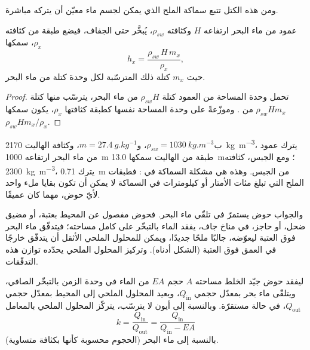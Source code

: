 ومن هذه الكتل تتبع سماكة الملح الذي يمكن لجسم ماء معيّن أن يتركه مباشرة.

\begin{proposition}\label{prop:b1:chemical-biogenic-sediments:column}
عمود من ماء البحر ارتفاعه $H$ وكثافته $\rho_{sw}$، يُبخَّر حتى الجفاف، فيضع طبقة من  كثافته $\rho_x$، سمكها
\[
h_x = \frac{\rho_{sw}\,H\,m_x}{\rho_x},
\]
حيث $m_x$ كتلة ذلك  المترسّبة لكل وحدة كتلة من ماء البحر.
\end{proposition}

\begin{proof}
تحمل وحدة المساحة من العمود كتلة $\rho_{sw}H$ من ماء البحر، يترسّب منها كتلة $\rho_{sw}Hm_x$ من . وموزّعةً على وحدة المساحة نفسها كطبقة كثافتها $\rho_x$، يكون سمكها $\rho_{sw}Hm_x/\rho_x$.
\end{proof}

ب$\rho_{sw} = \qty{1030}{kg.m^{-3}}$، و$m = \qty{27.4}{g.kg^{-1}}$، وكثافة الهاليت \qty{2170}{kg.m^{-3}}، يترك عمود من ماء البحر ارتفاعه \qty{1000}{m} طبقة من الهاليت سمكها \qty{13.0}{m}؛ ومع الجبس، كثافته \qty{2300}{kg.m^{-3}}، يترك \qty{0.71}{m} من الجبس. وهذه هي مشكلة السماكة في : فطبقات الملح التي تبلغ مئات الأمتار أو كيلومترات في السماكة لا يمكن أن تكون بقايا ملء واحد لأيّ حوض، مهما كان عميقًا.

والجواب حوض يستمرّ في تلقّي ماء البحر. فحوض مفصول عن المحيط بعتبة، أو مضيق ضحل، أو حاجز، في مناخ جاف، يفقد الماء بالتبخّر على كامل مساحته؛ فيتدفّق ماء البحر فوق العتبة ليعوّضه، جالبًا ملحًا جديدًا، ويمكن للمحلول الملحي الأثقل أن يتدفّق خارجًا في العمق فوق العتبة (الشكل أدناه). وتركيز المحلول الملحي يحدّده توازن هذه التدفّقات.

\begin{proposition}\label{prop:b1:chemical-biogenic-sediments:barred}
ليفقد حوض جيّد الخلط مساحته $A$ حجم $EA$ من الماء في وحدة الزمن بالتبخّر الصافي، ويتلقّى ماء بحر بمعدّل حجمي $Q_{\mathrm{in}}$، ويعيد المحلول الملحي إلى المحيط بمعدّل حجمي $Q_{\mathrm{out}}$، في حالة مستقرّة. وبالنسبة إلى أيون لا يترسّب، يتركّز المحلول الملحي بالمعامل
\[
k = \frac{Q_{\mathrm{in}}}{Q_{\mathrm{out}}} = \frac{Q_{\mathrm{in}}}{Q_{\mathrm{in}} - EA}
\]
بالنسبة إلى ماء البحر (الحجوم محسوبة كأنها بكثافة متساوية).
\end{proposition}

